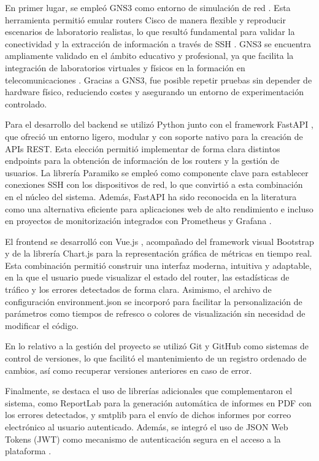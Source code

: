En primer lugar, se empleó GNS3 como entorno de simulación de red \citep{GNS3}. Esta herramienta permitió emular routers Cisco de manera flexible y reproducir escenarios de laboratorio realistas, lo que resultó fundamental para validar la conectividad y la extracción de información a través de SSH \citep{SSH}. GNS3 se encuentra ampliamente validado en el ámbito educativo y profesional, ya que facilita la integración de laboratorios virtuales y físicos en la formación en telecomunicaciones \citep{Kumar2015,Santos2021}. Gracias a GNS3, fue posible repetir pruebas sin depender de hardware físico, reduciendo costes y asegurando un entorno de experimentación controlado.

Para el desarrollo del backend se utilizó Python junto con el framework FastAPI \citep{FastAPI}, que ofreció un entorno ligero, modular y con soporte nativo para la creación de APIs REST. Esta elección permitió implementar de forma clara distintos endpoints para la obtención de información de los routers y la gestión de usuarios. La librería {Paramiko} se empleó como componente clave para establecer conexiones SSH con los dispositivos de red, lo que convirtió a esta combinación en el núcleo del sistema. Además, FastAPI ha sido reconocida en la literatura como una alternativa eficiente para aplicaciones web de alto rendimiento \citep{Tolo2022} e incluso en proyectos de monitorización integrados con Prometheus y Grafana \citep{Mwaura2023}.

El frontend se desarrolló con Vue.js \citep{Vue}, acompañado del framework visual Bootstrap \citep{Bootstrap} y de la librería Chart.js \citep{ChartJS,ChartJSmanual2024} para la representación gráfica de métricas en tiempo real. Esta combinación permitió construir una interfaz moderna, intuitiva y adaptable, en la que el usuario puede visualizar el estado del router, las estadísticas de tráfico y los errores detectados de forma clara. Asimismo, el archivo de configuración environment.json se incorporó para facilitar la personalización de parámetros como tiempos de refresco o colores de visualización sin necesidad de modificar el código.

En lo relativo a la gestión del proyecto se utilizó Git y GitHub como sistemas de control de versiones, lo que facilitó el mantenimiento de un registro ordenado de cambios, así como recuperar versiones anteriores en caso de error.

Finalmente, se destaca el uso de librerías adicionales que complementaron el sistema, como ReportLab para la generación automática de informes en PDF con los errores detectados, y smtplib para el envío de dichos informes por correo electrónico al usuario autenticado. Además, se integró el uso de JSON Web Tokens (JWT) como mecanismo de autenticación segura en el acceso a la plataforma \citep{JWT}.

